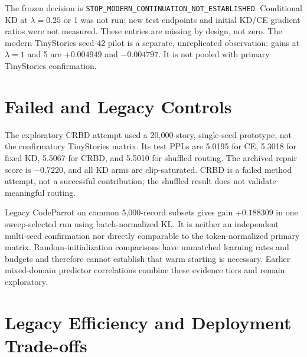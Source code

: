 The frozen decision is \texttt{STOP\_MODERN\_CONTINUATION\_NOT\_ESTABLISHED}. Conditional KD at $\lambda=0.25$ or 1 was not run; new test endpoints and initial KD/CE gradient ratios were not measured. These entries are missing by design, not zero. The modern TinyStories seed-42 pilot is a separate, unreplicated observation: gains at $\lambda=1$ and 5 are $+0.004949$ and $-0.004797$. It is not pooled with primary TinyStories confirmation.



\section{Failed and Legacy Controls}\label{app:failed-controls}

The exploratory CRBD attempt used a 20,000-story, single-seed prototype, not the confirmatory TinyStories matrix. Its test PPLs are 5.0195 for CE, 5.3018 for fixed KD, 5.5067 for CRBD, and 5.5010 for shuffled routing. The archived repair score is $-0.7220$, and all KD arms are clip-saturated. CRBD is a failed method attempt, not a successful contribution; the shuffled result does not validate meaningful routing.

Legacy CodeParrot on common 5,000-record subsets gives gain $+0.188309$ in one sweep-selected run using batch-normalized KL. It is neither an independent multi-seed confirmation nor directly comparable to the token-normalized primary matrix. Random-initialization comparisons have unmatched learning rates and budgets and therefore cannot establish that warm starting is necessary. Earlier mixed-domain predictor correlations combine these evidence tiers and remain exploratory.

\section{Legacy Efficiency and Deployment Trade-offs}\label{app:efficiency}


